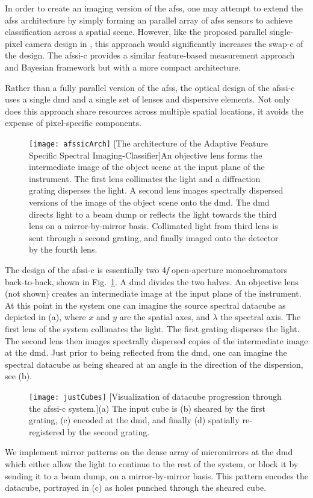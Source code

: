 In order to create an imaging version of the \gls{afss}, one may attempt to extend the \gls{afss} architecture by simply forming an parallel array of \gls{afss} sensors to achieve classification across a spatial scene. However, like the proposed parallel single-pixel camera design in , this approach would significantly increases the \gls{swap-c} of the design. The \gls{afssi-c} provides a similar feature-based measurement approach and Bayesian framework but with a more compact architecture.

Rather than a fully parallel version of the \gls{afss}, the optical design of the \gls{afssi-c} uses a single \gls{dmd} and a single set of lenses and dispersive elements. Not only does this approach share resources across multiple spatial locations, it avoids the expense of pixel-specific components.


\begin{figure}
	\texttt{[image: afssicArch]}
	[The architecture of the Adaptive Feature Specific Spectral Imaging-Classifier]{An objective lens forms the intermediate image of the object scene at the input plane of the instrument. The first lens collimates the light and a diffraction grating disperses the light. A second lens images spectrally dispersed versions of the image of the object scene onto the \gls{dmd}. The \gls{dmd} directs light to a beam dump or reflects the light towards the third lens on a mirror-by-mirror basis. Collimated light from third lens
is sent through a second grating, and finally imaged onto the detector by the fourth lens.}
	\label{fig:afssicArch}
\end{figure}


The design of the \gls{afssi-c} is essentially two 4\textit{f} open-aperture monochromators back-to-back, shown in Fig.~\ref{fig:afssicArch}. A \gls{dmd} divides the two halves. An objective lens (not shown) creates an intermediate image at the input plane of the instrument. At this point in the system one can imagine the source spectral datacube as depicted in (a), where $x$ and $y$ are the spatial axes, and $\lambda$ the spectral axis. The first lens of the system collimates the light. The first grating disperses the light. The second lens then images spectrally dispersed copies of the intermediate image at the \gls{dmd}. Just prior to being reflected from the \gls{dmd}, one can imagine the spectral datacube as being sheared at an angle in the direction of the dispersion, see (b). 
%
%
\begin{figure}
	\texttt{[image: justCubes]}
	[Visualization of datacube progression through the \gls{afssi-c} system.]{(a) The input cube is (b) sheared by the first grating, (c) encoded at the \gls{dmd}, and finally (d) spatially re-registered by the second grating.}
	\label{fig:sysCubes}
\end{figure}
%
%
We implement mirror patterns on the dense array of micromirrors at the \gls{dmd} which either allow the light to continue to the rest of the system, or block it by sending it to a beam dump, on a mirror-by-mirror basis. This pattern encodes the datacube, portrayed in (c) as holes punched through the sheared cube.


